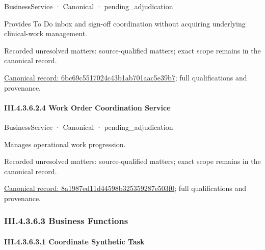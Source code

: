 \label{element:6bc69c5517024c43b1ab701aac5e39b7}
{\small BusinessService · Canonical · pending\_adjudication}\par

Provides To Do inbox and sign-off coordination without acquiring underlying clinical-work management.


{\small Recorded unresolved matters: source-qualified matters; exact scope remains in the canonical record.}\par
{\footnotesize \href{../../../../continuum/business/business-service/6bc69c5517024c43b1ab701aac5e39b7.md}{Canonical record: 6bc69c5517024c43b1ab701aac5e39b7}; full qualifications and provenance.}\par
\paragraph*{III.4.3.6.2.4 Work Order Coordination Service}
\label{navigation:III.4.3.6.2.4}

\label{element:8a1987ed11d44598b325359287e503f0}
{\small BusinessService · Canonical · pending\_adjudication}\par

Manages operational work progression.


{\small Recorded unresolved matters: source-qualified matters; exact scope remains in the canonical record.}\par
{\footnotesize \href{../../../../continuum/business/business-service/8a1987ed11d44598b325359287e503f0.md}{Canonical record: 8a1987ed11d44598b325359287e503f0}; full qualifications and provenance.}\par
\subsubsection*{III.4.3.6.3 Business Functions}
\label{navigation:III.4.3.6.3}

\paragraph*{III.4.3.6.3.1 Coordinate Synthetic Task}
\label{navigation:III.4.3.6.3.1}

